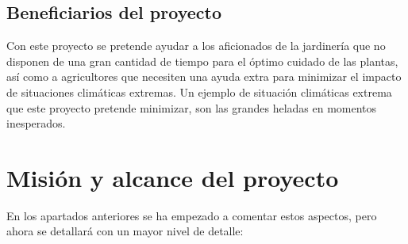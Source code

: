 \documentclass[runningheads]{llncs}
\begin{document}
    \subsection{Beneficiarios del proyecto}
    Con este proyecto se pretende ayudar a los aficionados de la jardinería que no disponen de una gran cantidad de tiempo para el óptimo cuidado de las plantas, así como a agricultores que necesiten una ayuda extra para minimizar el impacto de situaciones climáticas extremas. Un ejemplo de situación  climáticas extrema que este proyecto pretende minimizar, son las grandes heladas en momentos inesperados. 
    
\section{Misión y alcance del proyecto}
En los apartados anteriores se ha empezado a comentar estos aspectos, pero ahora se detallará con un mayor nivel de detalle:
\end{document}
